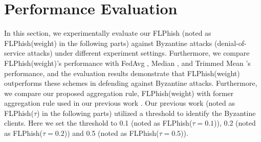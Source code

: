 \documentclass[lettersize,journal]{IEEEtran}
\begin{document}
\section{Performance Evaluation}
In this section, we experimentally evaluate our FLPhish (noted as FLPhish(weight) in the following parts) against Byzantine attacks (denial-of-service attacks) under different experiment settings. Furthermore, we compare FLPhish(weight)'s performance with FedAvg \cite{ref_01_GoogleFL}, Median \cite{ref_13_defense}, and Trimmed Mean \cite{ref_13_defense}'s performance, and the evaluation results demonstrate that FLPhish(weight) outperforms these schemes in defending against Byzantine attacks. Furthermore, we compare our proposed aggregation rule, FLPhish(weight) with former aggregation rule used in our previous work \cite{li2021flphish}. Our previous work (noted as FLPhish($\tau$) in the following parts) utilized a threshold to identify the Byzantine clients. Here we set the threshold to 0.1 (noted as FLPhish($\tau=0.1$)), 0.2 (noted as FLPhish($\tau=0.2$)) and 0.5 (noted as FLPhish($\tau=0.5$)).

\begin{table}[t]
  \renewcommand\arraystretch{1.5}
  \centering
  \caption{Evaluated Scheme}
  \end{table}
\end{document}
